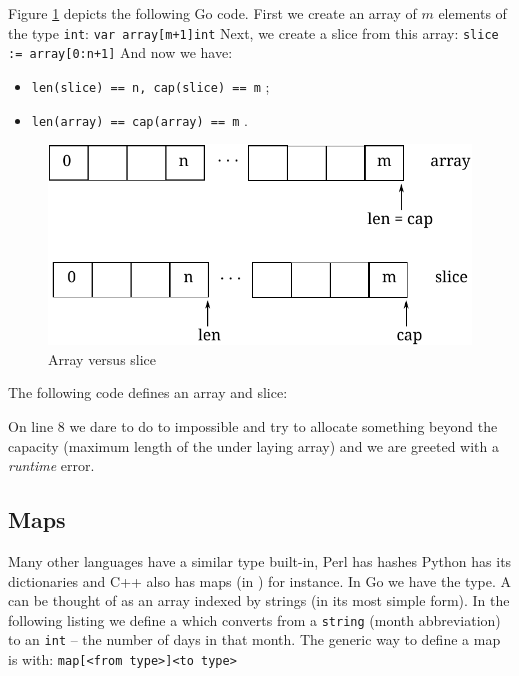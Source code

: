 Figure \ref{fig:array-vs-slice} depicts the following Go code.
First we create an array of $m$ elements of the type \lstinline{int}:
\lstinline{var array[m+1]int}\newline
Next, we create a slice from this array:
\lstinline{slice := array[0:n+1]}\newline
And now we have:
\begin{itemize}
\item{\lstinline{len(slice) == n, cap(slice) == m}{} ;}
\item{\lstinline{len(array) == cap(array) == m}{} .}
\end{itemize}
\begin{figure}[H]
\caption{Array versus slice}
\label{fig:array-vs-slice}
\begin{center}
\includegraphics[scale=0.65]{fig/array-vs-slice.pdf}
\end{center}
\end{figure}

The following code defines an array and slice:

On line 8 we dare to do to impossible and try to allocate something
beyond the capacity (maximum length of the under laying array) and
we are greeted with a \emph{runtime} error.

\subsection{Maps}
\label{sec:maps}
Many other languages have a similar type built-in, Perl has hashes
Python has its dictionaries and C++ also has maps (in
) for instance. 
In Go we have the
 type. A  can be thought of as an array indexed by
strings (in its most simple form).
In the following listing we define a  which converts from a
\lstinline{string} (month abbreviation) to an \lstinline{int} -- the number of days in that month. 
The generic way to define a map is with: \verb|map[<from type>]<to type>|

